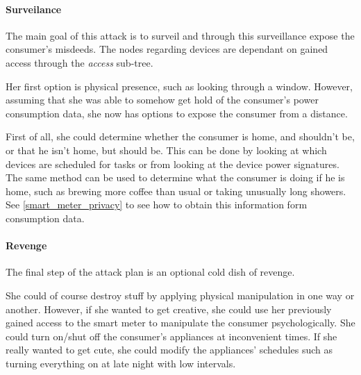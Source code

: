 \paragraph{Surveilance}
The main goal of this attack is to surveil and through this surveillance expose the consumer's misdeeds.
The nodes regarding devices are dependant on gained access through the \textit{access} sub-tree.

Her first option is physical presence, such as looking through a window.
However, assuming that she was able to somehow get hold of the consumer's power consumption data, she now has options to expose the consumer from a distance.

First of all, she could determine whether the consumer is home, and shouldn't be, or that he isn't home, but should be.
This can be done by looking at which devices are scheduled for tasks or from looking at the device power signatures.
The same method can be used to determine what the consumer is doing if he is home, such as brewing more coffee than usual or taking unusually long showers.
See \cref{smart_meter_privacy} to see how to obtain this information form consumption data.

\paragraph{Revenge}
The final step of the attack plan is an optional cold dish of revenge.

She could of course destroy stuff by applying physical manipulation in one way or another.
However, if she wanted to get creative, she could use her previously gained access to the smart meter to manipulate the consumer psychologically.
She could turn on/shut off the consumer's appliances at inconvenient times.
If she really wanted to get cute, she could modify the appliances' schedules such as turning everything on at late night with low intervals.